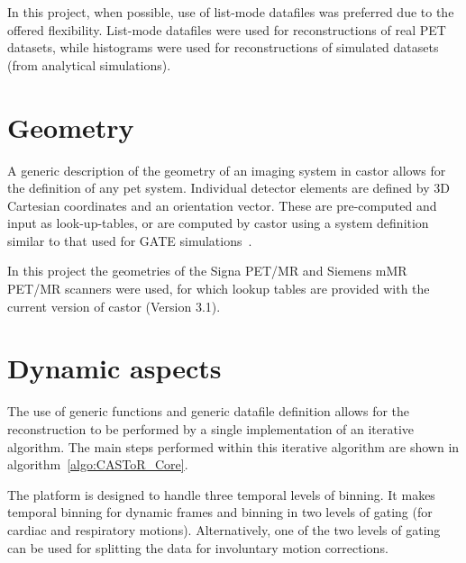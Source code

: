 In this project, when possible, use of list-mode datafiles was preferred due to the offered flexibility. 
List-mode datafiles were used for reconstructions of real PET datasets, while histograms were used for reconstructions of simulated datasets (from analytical simulations).

\section{Geometry}
A generic description of the geometry of an imaging system in \gls{castor} allows for the definition of any \gls{pet} system. Individual detector elements are defined by 3D Cartesian coordinates and an orientation vector. These are pre-computed and input as look-up-tables, or are computed by \gls{castor} using a system definition similar to that used for GATE simulations~\cite{Jan2011}.

In this project the geometries of the Signa PET/MR and Siemens mMR PET/MR scanners were used, for which lookup tables are provided with the current version of \gls{castor} (Version 3.1). 

\section{Dynamic aspects}

The use of generic functions and generic datafile definition allows for the reconstruction to be performed by a single implementation of an iterative algorithm. The main steps performed within this iterative algorithm are shown in algorithm~\ref{algo:CASToR_Core}. 

The platform is designed to handle three temporal levels of binning. It makes temporal binning for dynamic frames and binning in two levels of gating (for cardiac and respiratory motions). Alternatively, one of the two levels of gating can be used for splitting the data for involuntary motion corrections. 


